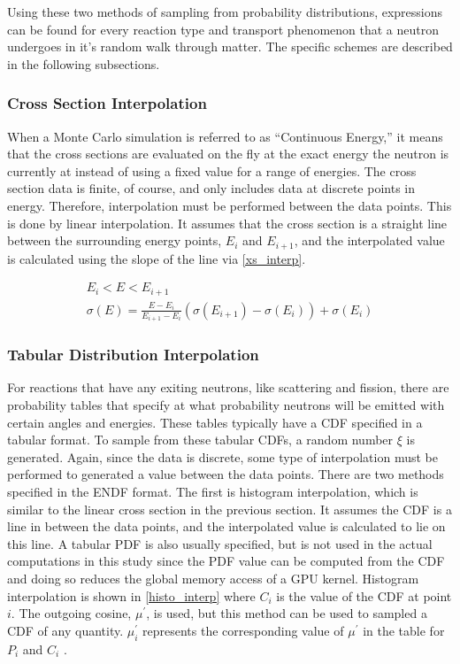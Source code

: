 Using these two methods of sampling from probability distributions, expressions can be found for every reaction type and transport phenomenon that a neutron undergoes in it's random walk through matter.  The specific schemes are described in the following subsections.

\subsubsection{Cross Section Interpolation}

When a Monte Carlo simulation is referred to as ``Continuous Energy,'' it means that the cross sections are evaluated on the fly at the exact energy the neutron is currently at instead of using a fixed value for a range of energies.  The cross section data is finite, of course, and only includes data at discrete points in energy.  Therefore, interpolation must be performed between the data points.  This is done by linear interpolation.  It assumes that the cross section is a straight line between the surrounding energy points, $E_i$ and $E_{i+1}$, and the interpolated value is calculated using the slope of the line via \eqref{xs_interp}.

 \begin{equation}
\label{xs_interp}
\begin{gathered}
E_i < E < E_{i+1} \\
\sigma(E) = \frac{E-E_i}{E_{i+1}-E_i}(\sigma(E_{i+1})-\sigma(E_i)) + \sigma(E_i)
\end{gathered}
\end{equation}

\subsubsection{Tabular Distribution Interpolation}

For reactions that have any exiting neutrons, like scattering and fission, there are probability tables that specify at what probability neutrons will be emitted with certain angles and energies.  These tables typically have a CDF specified in a tabular format.  To sample from these tabular CDFs, a random number $\xi$ is generated.  Again, since the data is discrete, some type of interpolation must be performed to generated a value between the data points.  There are two methods specified in the ENDF format.  The first is histogram interpolation, which is similar to the linear cross section in the previous section.  It assumes the CDF is a line in between the data points, and the interpolated value is calculated to lie on this line.  A tabular PDF is also usually specified, but is not used in the actual computations in this study since the PDF value can be computed from the CDF and doing so reduces the global memory access of a GPU kernel.  Histogram interpolation is shown in \eqref{histo_interp} where $C_{i}$ is the value of the CDF at point $i$.  The outgoing cosine, $\mu^\prime$, is used, but this method can be used to sampled a CDF of any quantity.  $\mu^\prime_i$ represents the corresponding value of $\mu^\prime$ in the table for $P_i$ and $C_i$ \cite{openmc}.

